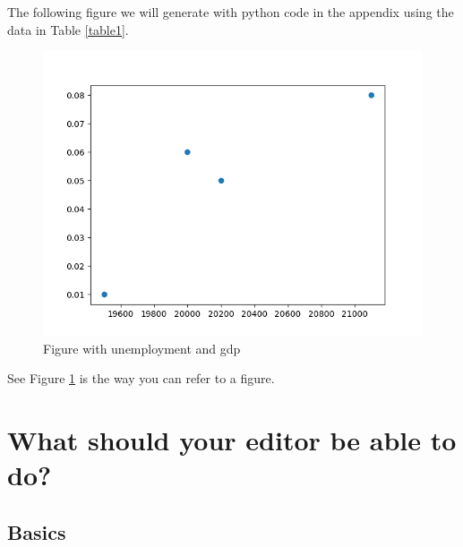 \documentclass[11pt]{article}
\begin{document}
The following figure we will generate with python code in the appendix using the data in Table \ref{table1}.

\begin{figure}[htbp]
\centering
\includegraphics[width=.9\linewidth]{./fig.png}
\caption{\label{fig:org92858f6}\label{figure1} Figure with unemployment and gdp}
\end{figure}

See Figure \ref{figure1} is the way you can refer to a figure.

\section{What should your editor be able to do?}
\label{sec:org85ffca8}


\subsection{Basics}
\label{sec:orgfe4494e}
\end{document}

